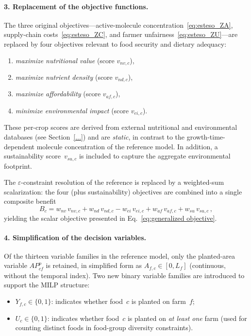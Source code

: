 \paragraph{3. Replacement of the objective functions.}
The three original objectives---active-molecule concentration~\eqref{eq:esteso_ZA}, supply-chain costs~\eqref{eq:esteso_ZC}, and farmer unfairness~\eqref{eq:esteso_ZU}---are replaced by four objectives relevant to food security and dietary adequacy:
\begin{enumerate}
    \item \emph{maximize nutritional value} (score $v_{nv,c}$),
    \item \emph{maximize nutrient density} (score $v_{nd,c}$),
    \item \emph{maximize affordability} (score $v_{af,c}$),
    \item \emph{minimize environmental impact} (score $v_{ei,c}$).
\end{enumerate}
These per-crop scores are derived from external nutritional and environmental databases (see Section~\ref{...}) and are \emph{static}, in contrast to the growth-time-dependent molecule concentration of the reference model. In addition, a sustainability score~$v_{su,c}$ is included to capture the aggregate environmental footprint.

The $\varepsilon$-constraint resolution of the reference is replaced by a weighted-sum scalarization: the four (plus sustainability) objectives are combined into a single composite benefit
\begin{equation}
    B_c = w_{nv}\,v_{nv,c} + w_{nd}\,v_{nd,c} - w_{ei}\,v_{ei,c} + w_{af}\,v_{af,c} + w_{su}\,v_{su,c}\,,
    \label{eq:composite_benefit}
\end{equation}
yielding the scalar objective presented in Eq.~\eqref{eq:generalized objective}.

\paragraph{4. Simplification of the decision variables.}
Of the thirteen variable families in the reference model, only the planted-area variable $AP^{p}_{cf}$ is retained, in simplified form as $A_{f,c} \in [0, L_f]$ (continuous, without the temporal index). Two new binary variable families are introduced to support the MILP structure:
\begin{itemize}
    \item $Y_{f,c} \in \{0,1\}$: indicates whether food~$c$ is planted on farm~$f$;
    \item $U_c \in \{0,1\}$: indicates whether food~$c$ is planted on \emph{at least one} farm (used for counting distinct foods in food-group diversity constraints).
\end{itemize}

